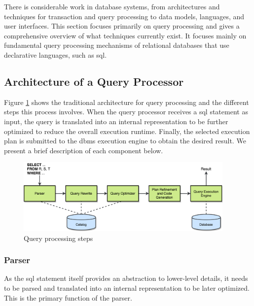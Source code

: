 \label{sec:foundations_of_query_processing}

There is considerable work in database systems, from architectures and techniques for transaction and query processing to data models, languages, and user interfaces. This section focuses primarily on query processing and gives a comprehensive overview of what techniques currently exist. It focuses mainly on fundamental query processing mechanisms of relational databases that use declarative languages, such as \gls{sql}.

\subsection{Architecture of a Query Processor}

Figure \ref{fig:query_processor} shows the traditional architecture for query processing and the different steps this process involves. When the query processor receives a \gls{sql} statement as input, the query is translated into an internal representation to be further optimized to reduce the overall execution runtime. Finally, the selected execution plan is submitted to the \gls{dbms} execution engine to obtain the desired result. We present a brief description of each component below.

\begin{figure}[ht]
\centering
\includegraphics[width=0.95\textwidth]{img/state_of_the_art/architecture_of_a_query_processor.png}
\caption{Query processing steps \citep{Kossmann2000}}
\label{fig:query_processor}
\end{figure}

\subsubsection{Parser}

As the \gls{sql} statement itself provides an abstraction to lower-level details, it needs to be parsed and translated into an internal representation to be later optimized. This is the primary function of the parser.

